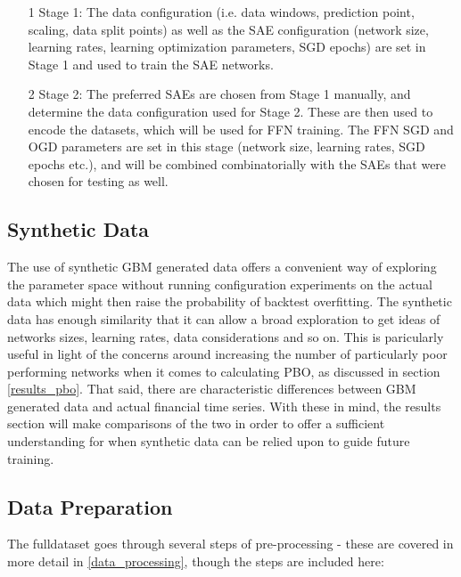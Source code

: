 \documentclass[a4paper,11pt,oneside]{article}
\theoremstyle{plain}
\theoremstyle{definition}
\begin{document}
	\begin{itemize}
		\item[1] Stage 1: The data configuration (i.e. data windows, prediction point, scaling, data split points) as well as the SAE configuration (network size, learning rates, learning optimization parameters, SGD epochs) are set in Stage 1 and used to train the SAE networks.
		\item[2] Stage 2: The preferred SAEs are chosen from Stage 1 manually, and determine the data configuration used for Stage 2. These are then used to encode the datasets, which will be used for FFN training. The FFN SGD and OGD parameters are set in this stage (network size, learning rates, SGD epochs etc.), and will be combined combinatorially with the SAEs that were chosen for testing as well.
	\end{itemize}
	
	\subsection{Synthetic Data}\label{proc_synthetic}
	
	The use of synthetic GBM generated data offers a convenient way of exploring the parameter space without running configuration experiments on the actual data which might then raise the probability of backtest overfitting. The synthetic data has enough similarity that it can allow a broad exploration to get ideas of networks sizes, learning rates, data considerations and so on. This is paricularly useful in light of the concerns around increasing the number of particularly poor performing networks when it comes to calculating PBO, as discussed in section \ref{results_pbo}. That said, there are characteristic differences between GBM generated data and actual financial time series. With these in mind, the results section will make comparisons of the two in order to offer a sufficient understanding for when synthetic data can be relied upon to guide future training.
	
	\subsection{Data Preparation}\label{proc_dataprep}
	
	The fulldataset goes through several steps of pre-processing - these are covered in more detail in \ref{data_processing}, though the steps are included here:
	
\end{document}
